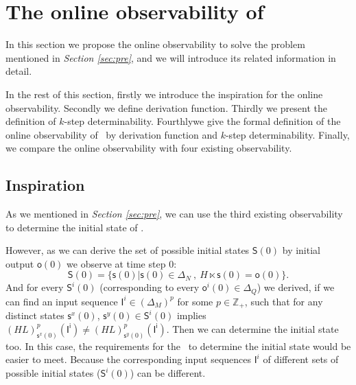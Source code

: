 \section{The online observability of \BCNs}
\label{sec:online}


In this section we propose the online observability to solve the problem mentioned in {\em Section \ref{sec:pre}}, and we will introduce its related information in detail. 

In the rest of this section, firstly we introduce the inspiration for the online observability. Secondly we define derivation function. Thirdly we present the definition of $k$-step determinability. Fourthlywe give the formal definition of the online observability of \BCNs\ by derivation function and $k$-step determinability. Finally, we compare the online observability with four existing observability.


\subsection{Inspiration}


As we mentioned in {\em Section \ref{sec:pre}}, we can use the third existing observability to determine the initial state of \BCN. 

However, as we can derive the set of possible initial states $\mathsf{S}(0)$ by initial output $\mathsf{o}(0)$ we observe at time step $0$:
\[\mathsf{S}(0)=\{\mathsf{s}(0)|\mathsf{s}(0)\in \Delta_N\ ,\ H\ltimes \mathsf{s}(0)=\mathsf{o}(0)\}.\]
And for every $\mathsf{S}^{i}(0)$ (corresponding to every $\mathsf{o}^{i}(0)\in \Delta_Q$) we derived, if we can find an input sequence $\mathsf{I}^{i}\in(\Delta_M)^p$ for some $p\in \mathbb{Z}_+$, such that for any distinct states $\mathsf{s}^{x}(0)$, $\mathsf{s}^{y}(0) \in \mathsf{S}^{i}(0)$ implies $(HL)^p_{\mathsf{s}^{x}(0)}(\mathsf{I^i})\neq (HL)^p_{\mathsf{s}^{y}(0)}(\mathsf{I^i})$. 
Then we can determine the initial state too. 
In this case, the requirements for the \BCN\ to determine the initial state would be easier to meet. Because the corresponding input sequences $\mathsf{I}^{i}$ of different sets of possible initial states ($\mathsf{S}^{i}(0)$) can be different. 

